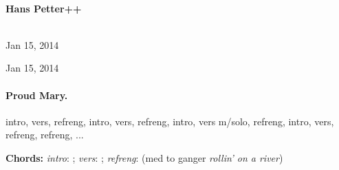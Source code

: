 \documentclass[%
twoside,                 %
final,                   %
10pt]{article}
\begin{document}
\begin{center}
\ \\ [2mm]


\author{Hans Petter++}

\author{Hans Petter++\inst{}}
\institute{}

\begin{center}
{\bf Hans Petter++${}^{}$} \\ [0mm]
\end{center}

\begin{center}
\end{center}


\date{Jan 15, 2014}
\maketitle
\date{Jan 15, 2014
}

\ \\ [10mm]
{\large\textsf{Jan 15, 2014}}

\end{center}
\vfill
\clearpage

\begin{center}
Jan 15, 2014
\end{center}

\vspace{1cm}





\vspace{1cm} %





\paragraph{Proud Mary.}
intro, vers, refreng, intro, vers, refreng, intro, vers m/solo, refreng,
intro, vers, refreng, refreng, ...

\textbf{Chords:} \emph{intro}: ;
\emph{vers}: ; \emph{refreng}:  (med to ganger \emph{rollin' on a river})
\end{document}
